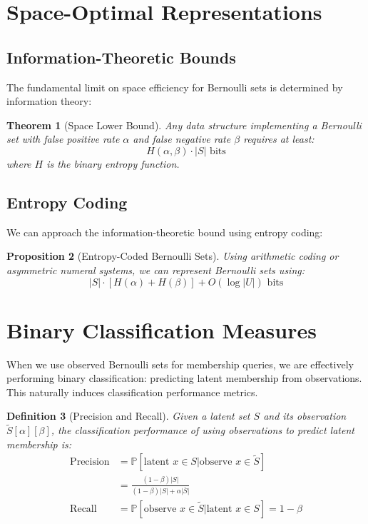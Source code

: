 \documentclass[11pt,final,hidelinks]{article}
\newtheorem{theorem}{Theorem}[section]
\newtheorem{proposition}[theorem]{Proposition}
\newtheorem{definition}[theorem]{Definition}
\newcommand{\obs}[1]{\widetilde{#1}}  %
\newcommand{\SetComplement}[1]{\overline{#1}}
\newcommand{\Prob}[1]{\mathbb{P}\left[#1\right]}
\newcommand{\Card}[1]{\lvert#1\rvert}
\newcommand{\fprate}{\alpha}
\newcommand{\fnrate}{\beta}
\begin{document}
\section{Space-Optimal Representations}

\subsection{Information-Theoretic Bounds}

The fundamental limit on space efficiency for Bernoulli sets is determined by information theory:

\begin{theorem}[Space Lower Bound]
Any data structure implementing a Bernoulli set with false positive rate $\fprate$ and false negative rate $\fnrate$ requires at least:
\begin{equation}
H(\fprate, \fnrate) \cdot \Card{S} \text{ bits}
\end{equation}
where $H$ is the binary entropy function.
\end{theorem}

\subsection{Entropy Coding}

We can approach the information-theoretic bound using entropy coding:

\begin{proposition}[Entropy-Coded Bernoulli Sets]
Using arithmetic coding or asymmetric numeral systems, we can represent Bernoulli sets using:
\begin{equation}
\Card{S} \cdot [H(\fprate) + H(\fnrate)] + O(\log \Card{U}) \text{ bits}
\end{equation}
\end{proposition}

\section{Binary Classification Measures}

When we use observed Bernoulli sets for membership queries, we are effectively performing binary classification: predicting latent membership from observations. This naturally induces classification performance metrics.

\begin{definition}[Precision and Recall]
Given a latent set $S$ and its observation $\obs{S}[\fprate][\fnrate]$, the classification performance of using observations to predict latent membership is:
\begin{align}
\text{Precision} &= \Prob{\text{latent } x \in S | \text{observe } x \in \obs{S}} \\
&= \frac{(1-\fnrate)\Card{S}}{(1-\fnrate)\Card{S} + \fprate\Card{\SetComplement{S}}} \\
\text{Recall} &= \Prob{\text{observe } x \in \obs{S} | \text{latent } x \in S} = 1 - \fnrate
\end{align}
\end{definition}
\end{document}
